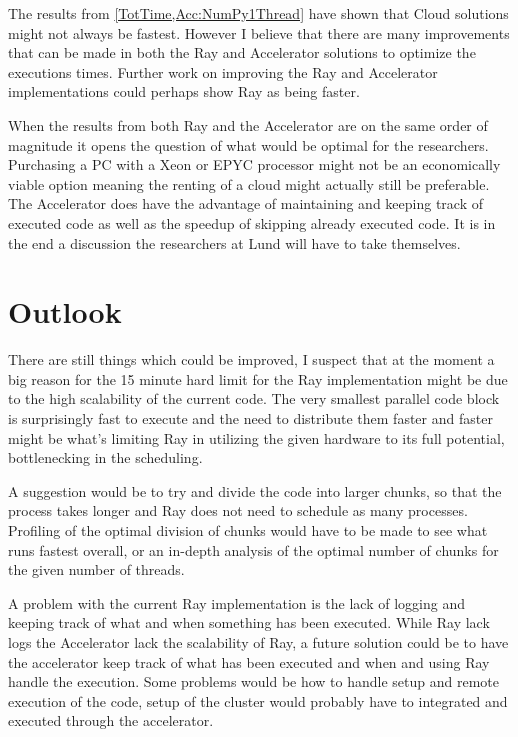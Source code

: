\documentclass[12pt, a4paper]{article}
\begin{document}
The results from \cref{TotTime,Acc:NumPy1Thread} have shown that Cloud solutions might not always be fastest.
However I believe that there are many improvements that can be made in both the Ray and Accelerator solutions to optimize the executions times.
Further work on improving the Ray and Accelerator implementations could perhaps show Ray as being faster.

When the results from both Ray and the Accelerator are on the same order of magnitude it opens the question of what would be optimal for the researchers.
Purchasing a PC with a Xeon or EPYC processor might not be an economically viable option meaning the renting of a cloud might actually still be preferable.
The Accelerator does have the advantage of maintaining and keeping track of executed code as well as the speedup of skipping already executed code.
It is in the end a discussion the researchers at Lund will have to take themselves.


\section{Outlook}

There are still things which could be improved, I suspect that at the moment a big reason for the 15 minute hard limit for the Ray implementation might be due to the high scalability of the current code.
The very smallest parallel code block is surprisingly fast to execute and the need to distribute them faster and faster might be what's limiting Ray in utilizing the given hardware to its full potential, bottlenecking in the scheduling.

A suggestion would be to try and divide the code into larger chunks, so that the process takes longer and Ray does not need to schedule as many processes.
Profiling of the optimal division of chunks would have to be made to see what runs fastest overall, or an in-depth analysis of the optimal number of chunks for the given number of threads.

A problem with the current Ray implementation is the lack of logging and keeping track of what and when something has been executed.
While Ray lack logs the Accelerator lack the scalability of Ray, a future solution could be to have the accelerator keep track of what has been executed and when and using Ray handle the execution.
Some problems would be how to handle setup and remote execution of the code, setup of the cluster would probably have to integrated and executed through the accelerator.
\end{document}
